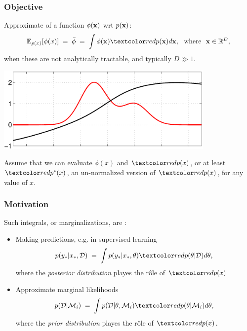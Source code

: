 




\begin{frame}
\frametitle{Objective}

Approximate  of a function $\phi(\mathbf x)$ wrt
 $p(\mathbf x)$:
\[
\E_{p(x)}[\phi(x)]\;=\;\bar\phi\;=\;\int \phi(\bfx)\Red{p(\bfx)}d\bfx,
\text{\ \ where\ \ }\bfx\in\R^D,
\]
when these are not analytically tractable, and typically $D\gg1$.
\begin{center}
\includegraphics[width=0.8\textwidth]{mc0}
\end{center}
Assume that we can evaluate $\phi(x)$ and $\Red{p(x)}$, or at least
$\Red{p^*(x)}$, an un-normalized version of $\Red{p(x)}$, for any value of $x$.
\end{frame}

\begin{frame}
\frametitle{Motivation}

Such integrals, or marginalizations, are :
\begin{itemize}
\item Making predictions, e.g. in supervised learning
\[
p(y_*|x_*,\D)\;=\;\int p(y_*|x_*,\theta)\Red{p(\theta|\D)}d\theta,
\]
where the \emph{posterior distribution} playes the rôle of $\Red{p(x)}$
\item Approximate marginal likelihoods
\[
p(\D|\M_i)\;=\;\int p(\D|\theta,\M_i)\Red{p(\theta|\M_i)}d\theta,
\]
where the \emph{prior distribution} playes the rôle of $\Red{p(x)}$.
\end{itemize}
\end{frame}

